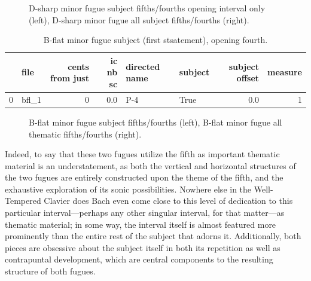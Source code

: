 \begin{figure}[H]
\vspace{1.5em}
    \centering
    \caption{D-sharp minor fugue subject fifths/fourths opening interval only (left), D-sharp minor fugue all subject fifths/fourths (right). }
\end{figure}\begin{singlespace}
\begin{table}[H]
\centering
\tiny
\begin{tabular}{|llrrllrr|}
\hline
\textbf{{}} & \textbf{  file} & \textbf{ cents from just} & \textbf{ ic nb sc} & \textbf{directed name} & \textbf{subject} & \textbf{ subject offset} & \textbf{ measure }\\
\hline
0 &  bfl\_1 &                0 &       0.0 &           P-4 &    True &             0.0 &        1 \\
\hline
\end{tabular}
\caption{B-flat minor fugue subject (first stsatement), opening fourth. }
\end{table}
\normalsize
\end{singlespace}



\begin{figure}[H]
\vspace{1.5em}
    \centering
    \caption{B-flat minor fugue subject fifths/fourths (left), B-flat minor fugue all thematic fifths/fourths (right). }
\end{figure}    Indeed, to say that these two fugues utilize the fifth as important
thematic material is an understatement, as both the vertical and
horizontal structures of the two fugues are entirely constructed upon
the theme of the fifth, and the exhaustive exploration of its sonic
possibilities. Nowhere else in the Well-Tempered Clavier does Bach even
come close to this level of dedication to this particular
interval---perhaps any other singular interval, for that
matter---as thematic material; in some way, the interval itself is
almost featured more prominently than the entire rest of the subject
that adorns it. Additionally, both pieces are obsessive about the
subject itself in both its repetition as well as contrapuntal
development, which are central components to the resulting structure of
both fugues.

